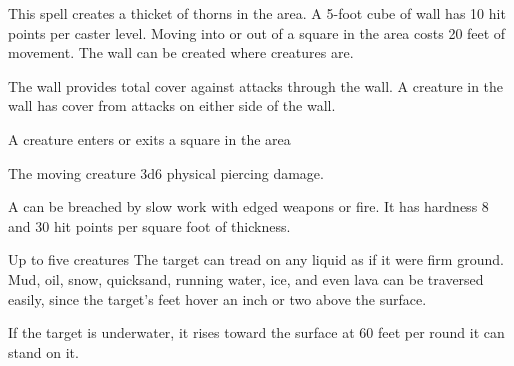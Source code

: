 \begin{spellheader}
    \spelldur{\durlong \dismissable}
    \spelleffect This spell creates a thicket of thorns in the area. A 5-foot cube of wall has 10 hit points per caster level. Moving into or out of a square in the area costs 20 feet of movement. The wall can be created where creatures are.

    The wall provides total cover against attacks through the wall. A creature in the wall has cover from attacks on either side of the wall.
\end{spellheader}
\begin{spelleffects}
    \begin{spelltrigger}{A creature enters or exits a square in the area}
        \begin{spelltarget}{The moving creature}
            \spelleffect 3d6 physical piercing damage.
        \end{spelltarget}
    \end{spelltrigger}
\end{spelleffects}
\begin{spellfooter}
    \spellnotes A  can be breached by slow work with edged weapons or fire. It has hardness 8 and 30 hit points per square foot of thickness.
\end{spellfooter}

\begin{spellheader}
    \spelldur{\durlong \dismissable}
\end{spellheader}
\begin{spelleffects}
    \begin{spelltargets}{Up to five creatures}
        \spelleffect The target can tread on any liquid as if it were firm ground. Mud, oil, snow, quicksand, running water, ice, and even lava can be traversed easily, since the target's feet hover an inch or two above the surface.
        \par If the target is underwater, it rises toward the surface at 60 feet per round it can stand on it.
    \end{spelltargets}
\end{spelleffects}
\begin{spellfooter}
    
\end{spellfooter}

